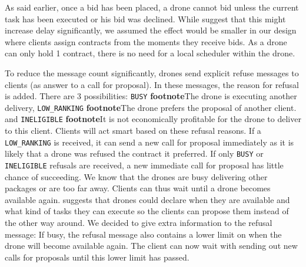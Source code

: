 \documentclass[10pt,a4paper]{article}
\begin{document}
{As said earlier, once a bid has been placed, a drone cannot bid unless the current task has been executed or his bid was declined. While \cite{CNET} suggest that this might increase delay significantly, we assumed the effect would be smaller in our design where clients assign contracts from the moments they receive bids. As a drone can only hold 1 contract, there is no need for a local scheduler within the drone.

To reduce the message count significantly, drones send explicit refuse messages to clients (as answer to a call for proposal). In these messages, the reason for refusal is added. There are 3 possibilities: \texttt{BUSY} \textbf{footnote}{The drone is executing another delivery}, \texttt{LOW\_RANKING} \textbf{footnote}{The drone prefers the proposal of another client.} and \texttt{INELIGIBLE} \textbf{footnote}{It is not economically profitable for the drone to deliver to this client}. Clients will act smart based on these refusal reasons. If a \texttt{LOW\_RANKING} is received, it can send a new call for proposal immediately as it is likely that a drone was refused the contract it preferred. If only \texttt{BUSY} or \texttt{INELIGIBLE} refusals are received, a new immediate call for proposal has little chance of succeeding. We know that the drones are busy delivering other packages or are too far away. Clients can thus wait until a drone becomes available again. \cite{CNET} suggests that drones could declare when they are available and what kind of tasks they can execute so the clients can propose them instead of the other way around. We decided to give extra information to the refusal message: If busy, the refusal message also contains a lower limit on when the drone will become available again. The client can now wait with sending out new calls for proposals until this lower limit has passed.}
\end{document}
